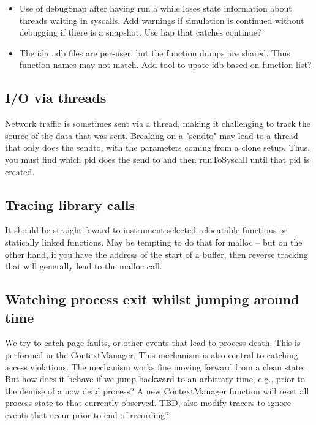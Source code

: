 \documentclass[titlepage]{article}
\begin{document}
\begin{appendices}
\begin{itemize}
\item Use of debugSnap after having run a while loses state information about threads waiting in syscalls.  Add warnings if simulation is
continued without debugging if there is a snapshot.  Use hap that catches continue?

\item The ida .idb files are per-user, but the function dumps are shared.  Thus function names may not match.  Add tool to upate idb based
on function list?
\end{itemize}

\subsection{I/O via threads}
Network traffic is sometimes sent via a thread, making it challenging to track the source of the data that was sent.  Breaking on a "sendto" may
lead to a thread that only does the sendto, with the parameters coming from a clone setup.  Thus, you must find which pid does the send to and then
runToSyscall until that pid is created.

\subsection{Tracing library calls}
It should be straight foward to instrument selected relocatable functions or statically linked functions.
May be tempting to do that for malloc -- but on the other hand, if you have the address of the start of a buffer, then reverse tracking that
will generally lead to the malloc call.



\subsection{Watching process exit whilst jumping around time}
We try to catch page faults, or other events that lead to process death.  This is performed in the ContextManager.  
This mechanism is also central to catching access violations.  The mechanism works fine moving forward from a clean state.  But
how does it behave if we jump backward to an arbitrary time, e.g., prior to the demise of a now dead process?  A new ContextManager function
will reset all process state to that currently observed.  TBD, also modify tracers to ignore events that occur prior to end of recording?


\end{appendices}
\end{document}

